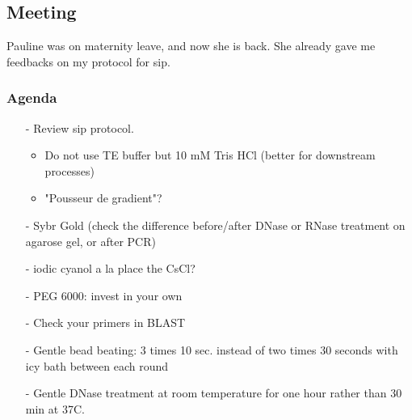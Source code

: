 \subsection{Meeting}
\label{task:20180228_cj0}

Pauline was on maternity leave, and now she is back. She already gave me feedbacks on my protocol for \gls{sip}.

\subsubsection{Agenda}
\begin{enumerate}
    \item[-] Review \gls{sip} protocol.
    \begin{itemize}
        \item Do not use TE buffer but 10 mM Tris HCl (better for downstream processes)
        \item "Pousseur de gradient"?
    \end{itemize}
    
    \item[-] Sybr Gold (check the difference before/after DNase or RNase treatment on agarose gel, or after PCR)
    \item[-] iodic cyanol a la place the CsCl?
    \item[-] PEG 6000: invest in your own
    \item[-] Check your primers in BLAST
    \item[-] Gentle bead beating: 3 times 10 sec. instead of two times 30 seconds with icy bath between each round
    \item[-] Gentle DNase treatment at room temperature for one hour rather than 30 min at 37\degree C.
\end{enumerate}


